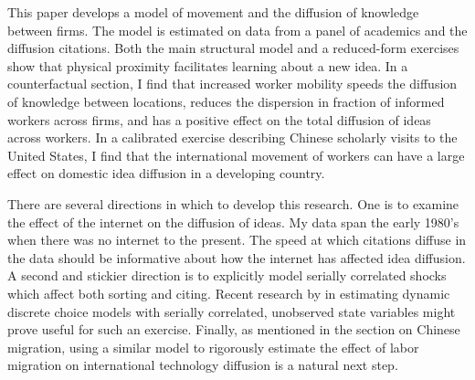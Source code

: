 This paper develops a model of movement and the diffusion of knowledge
between firms. The model is estimated on data from a panel of academics
and the diffusion citations. Both the main structural model and
a reduced-form exercises show that physical proximity facilitates learning
 about a new idea. In a counterfactual section, I find that increased worker mobility
 speeds the diffusion of knowledge between locations, reduces 
the dispersion in fraction of informed workers across firms, and has a
positive effect on the total diffusion of ideas across workers.
In a calibrated exercise describing Chinese scholarly visits to the United
States, I find that the international movement of workers can have a large 
effect on domestic idea diffusion in a developing country.

There are several directions in which to develop this research.  One is to examine the effect of the internet on the diffusion of ideas.  My data span the early 1980's when there was no internet to the present.  The speed at which citations diffuse in the data should be informative about how the internet has affected idea diffusion.  A second and stickier direction is to explicitly model serially correlated shocks which affect both sorting and citing.  Recent research by \citet{arcidiacono2011conditional} in estimating dynamic discrete choice models with serially correlated, unobserved state variables might prove useful for such an exercise.  Finally, as mentioned in the section on Chinese migration, using a similar model to rigorously estimate the effect of labor migration on international technology diffusion is a natural next step.



